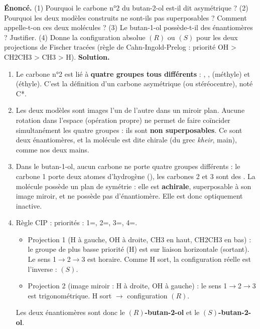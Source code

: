 \documentclass[11pt]{article}
\newcommand{\cle}[1]{{\popxbold\color{popdark}#1}}
\begin{document}
\begin{exoresolu}
\textbf{Énoncé.} (1) Pourquoi le carbone n°2 du butan-2-ol est-il dit asymétrique ? (2) Pourquoi les deux modèles construits ne sont-ils pas superposables ? Comment appelle-t-on ces deux molécules ? (3) Le butan-1-ol  possède-t-il des énantiomères ? Justifier. (4) Donne la configuration absolue $(R)$ ou $(S)$ pour les deux projections de Fischer tracées (règle de Cahn-Ingold-Prelog : priorité OH > CH2CH3 > CH3 > H).
\tcblower
\textbf{Solution.}
\begin{enumerate}
\item Le carbone n°2 est lié à \textbf{quatre groupes tous différents} : , ,  (méthyle) et  (éthyle). C'est la définition d'un \cle{carbone asymétrique} (ou stéréocentre), noté C*.
\item Les deux modèles sont images l'un de l'autre dans un miroir plan. Aucune rotation dans l'espace (opération propre) ne permet de faire coïncider simultanément les quatre groupes : ils sont \textbf{non superposables}. Ce sont deux \cle{énantiomères}, et la molécule est dite \cle{chirale} (du grec \emph{kheir}, main), comme nos deux mains.
\item Dans le butan-1-ol, aucun carbone ne porte quatre groupes différents : le carbone 1 porte deux atomes d'hydrogène (), les carbones 2 et 3 sont des . La molécule possède un plan de symétrie : elle est \textbf{achirale}, superposable à son image miroir, et ne possède pas d'énantiomère. Elle est donc optiquement inactive.
\item Règle CIP : priorités : 1=, 2=, 3=, 4=.
\begin{itemize}
\item Projection 1 (H à gauche, OH à droite, CH3 en haut, CH2CH3 en bas) : le groupe de plus basse priorité (H) est sur liaison horizontale (sortant). Le sens 1$\to$2$\to$3 est horaire. Comme H sort, la configuration réelle est l'inverse : \textbf{$(S)$}.
\item Projection 2 (image miroir : H à droite, OH à gauche) : le sens 1$\to$2$\to$3 est trigonométrique. H sort $\rightarrow$ configuration \textbf{$(R)$}.
\end{itemize}
Les deux énantiomères sont donc le \textbf{$(R)$-butan-2-ol} et le \textbf{$(S)$-butan-2-ol}.
\end{enumerate}
\end{exoresolu}
\end{document}
